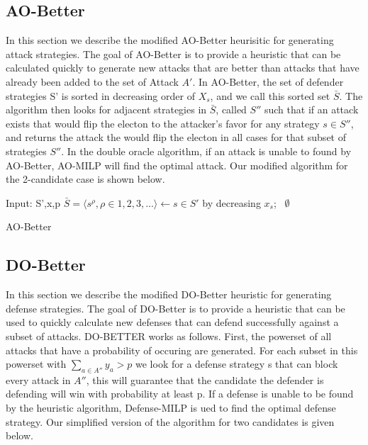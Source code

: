 \documentclass[letterpaper]{article} %
\begin{document}
\subsection{AO-Better}
In this section we describe the modified AO-Better heurisitic for generating attack strategies. The goal of AO-Better is to provide a heuristic that can be calculated quickly to generate new attacks that are better than attacks that have already been added to the set of Attack $A'$. In AO-Better, the set of defender strategies S' is sorted in decreasing order of $X_s$, and we call this sorted set $\bar{S}$. The algorithm then looks for adjacent strategies in $\bar{S}$, called $S''$ such that if an attack exists that would flip the electon to the attacker's favor for any strategy $s \in S''$, and returns the attack the would flip the electon in all cases for that subset of strategies $S''$. In the double oracle algorithm, if an attack is unable to found by AO-Better, AO-MILP will find the optimal attack. Our modified algorithm for the 2-candidate case is shown below.

\begin{algorithm}
\SetAlgoLined
{}
 Input: S',x,p\;
$\bar{S} =  \langle s^{\rho}, \rho \in 1, 2, 3, ...\rangle \leftarrow s \in S'$ by decreasing $x_s$;\
\Return $\emptyset$
 \caption{AO-Better}
\end{algorithm}


\subsection{DO-Better}
In this section we describe the modified DO-Better heuristic for generating defense strategies. The goal of DO-Better is to provide a heuristic that can be used to quickly calculate new defenses that can defend successfully against a subset of attacks. DO-BETTER works as follows. First, the powerset of all attacks that have a probability of occuring are generated. For each subset in this powerset with $\sum_{a \in A''} y_a > p$ we look for a defense strategy s that can block every attack in $A''$, this will guarantee that the candidate the defender is defending will win with probability at least p. If a defense is unable to be found by the heuristic algorithm, Defense-MILP is ued to find the optimal defense strategy. Our simplified version of the algorithm for two candidates is given below. 
\end{document}
